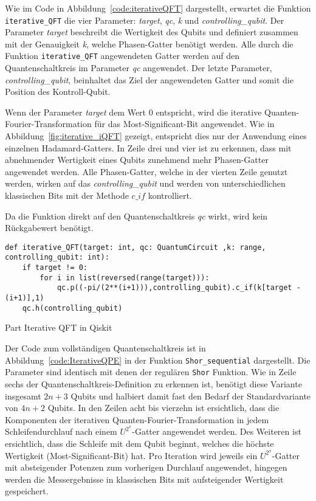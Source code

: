 Wie im Code in Abbildung~\ref{code:iterativeQFT} dargestellt, 
erwartet die Funktion \texttt{iterative\_QFT} die vier Parameter: \textit{target}, \textit{qc}, \textit{k} und \textit{controlling\_qubit}.
Der Parameter \textit{target} beschreibt die Wertigkeit des Qubits und 
definiert zusammen mit der Genauigkeit \textit{k}, 
welche Phasen-Gatter benötigt werden.
Alle durch die Funktion \texttt{iterative\_QFT} angewendeten Gatter 
werden auf den Quantenschaltkreis im Parameter \textit{qc} angewendet.
Der letzte Parameter, \textit{controlling\_qubit}, beinhaltet das Ziel der angewendeten Gatter und 
somit die Position des Kontroll-Qubit.

Wenn der Parameter \textit{target} dem Wert 0 entspricht, 
wird die iterative Quanten-Fourier-Transformation für das Most-Significant-Bit angewendet.
Wie in Abbildung~\ref{fig:iterative_iQFT} gezeigt, entspricht dies nur der Anwendung eines einzelnen Hadamard-Gatters.
In Zeile drei und vier ist zu erkennen, 
dass mit abnehmender Wertigkeit eines Qubits zunehmend mehr Phasen-Gatter angewendet werden.
Alle Phasen-Gatter, welche in der vierten Zeile genutzt werden, 
wirken auf das \textit{controlling\_qubit} und 
werden von unterschiedlichen klassischen Bits mit der Methode \(c\_if\) kontrolliert.

Da die Funktion direkt auf den Quantenschaltkreis \textit{qc} wirkt, 
wird kein Rückgabewert benötigt.
\begin{listing}[H]
\begin{verbatim}    
def iterative_QFT(target: int, qc: QuantumCircuit ,k: range, controlling_qubit: int):
    if target != 0:
        for i in list(reversed(range(target))):
            qc.p((-pi/(2**(i+1))),controlling_qubit).c_if(k[target - (i+1)],1)
    qc.h(controlling_qubit)
  \end{verbatim}
  \caption{Part Iterative QFT in Qiskit}
  \label{code:iterativeQFT}
\end{listing}

Der Code zum vollständigen Quantenschaltkreis ist in Abbildung~\ref{code:IterativeQPE} in der Funktion \texttt{Shor\_sequential} dargestellt.
Die Parameter sind identisch mit denen der regulären \texttt{Shor} Funktion. 
Wie in Zeile sechs der Quantenschaltkreis-Definition zu erkennen ist, 
benötigt diese Variante insgesamt \(2n+3\) Qubits und halbiert damit fast den Bedarf der Standardvariante von \(4n+2\) Qubits.
In den Zeilen acht bis vierzehn ist ersichtlich, 
dass die Komponenten der iterativen Quanten-Fourier-Transformation in jedem Schleifendurchlauf nach einem \(U^{2^x}\)-Gatter angewendet werden. 
Des Weiteren ist ersichtlich, 
dass die Schleife mit dem Qubit beginnt, 
welches die höchste Wertigkeit (Most-Significant-Bit) hat.
Pro Iteration wird jeweils ein \(U^{2^x}\)-Gatter mit absteigender Potenzen zum vorherigen Durchlauf angewendet, 
hingegen werden die Messergebnisse in klassischen Bits mit aufsteigender Wertigkeit gespeichert.

